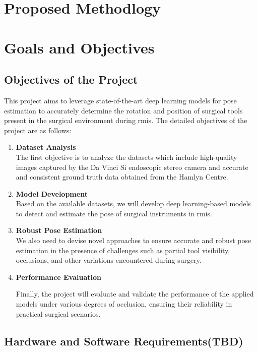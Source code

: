 \documentclass[12pt]{article}
\begin{document}
\section{Proposed Methodlogy}


\section{Goals and Objectives}
\subsection{Objectives of the Project}
This project aims to leverage state-of-the-art deep learning models for pose estimation to accurately determine the rotation and position of surgical tools present in the surgical environment during \gls{rmis}. The detailed objectives of the project are as follows:

\begin{enumerate}

\item \textbf{Dataset Analysis}
\\The first objective is to analyze the datasets which include high-quality images captured by the Da Vinci Si endoscopic stereo camera and accurate and consistent ground truth data obtained from the Hamlyn Centre.

\item \textbf{Model Development}
\\Based on the available datasets, we will develop deep learning-based models to detect and estimate the pose of surgical instruments in \gls{rmis}.

\item \textbf{Robust Pose Estimation}
\\We also need to devise novel approaches to ensure accurate and robust pose estimation in the presence of challenges such as partial tool visibility, occlusions, and other variations encountered during surgery. 

\item \textbf{Performance Evaluation}

Finally, the project will evaluate and validate the performance of the applied models under various degrees of occlusion, ensuring their reliability in practical surgical scenarios.

\end{enumerate}


\subsection{Hardware and Software Requirements(TBD)}
\end{document}

